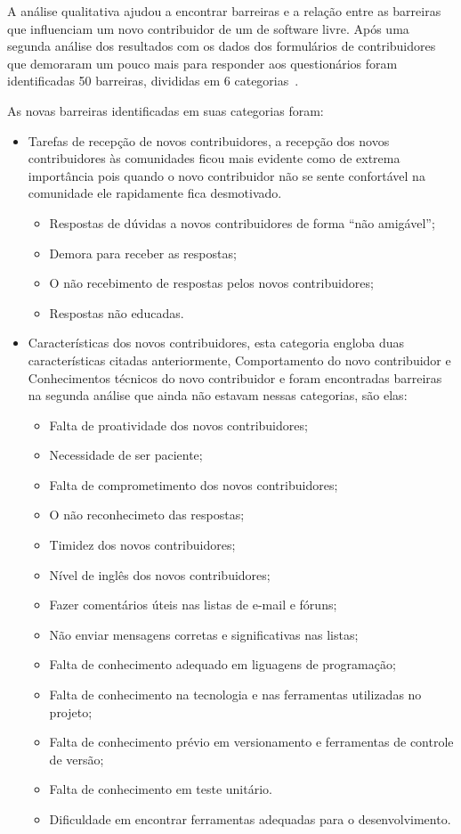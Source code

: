 A análise qualitativa ajudou a encontrar barreiras e a relação entre as barreiras
que influenciam um novo contribuidor de um de software livre.
Após uma segunda análise dos resultados com os dados dos formulários de contribuidores 
que demoraram um pouco mais para responder aos questionários foram identificadas 
50 barreiras, divididas em 6 categorias~\cite{6943482}. 

As novas barreiras identificadas em suas categorias foram:

\begin{itemize}

\item Tarefas de recepção de novos contribuidores, a recepção dos novos contribuidores às 
comunidades ficou mais evidente como de extrema importância pois quando o novo 
contribuidor não se sente confortável na comunidade ele rapidamente fica desmotivado.
	\begin{itemize}
	\item Respostas de dúvidas a novos contribuidores de forma ``não amigável'';
	\item Demora para receber as respostas;
	\item O não recebimento de respostas pelos novos contribuidores;
	\item Respostas não educadas.
	\end{itemize}

\item Características dos novos contribuidores, esta categoria engloba duas características
citadas anteriormente, Comportamento do novo contribuidor e Conhecimentos técnicos do novo
contribuidor e foram encontradas barreiras na segunda análise que ainda não estavam nessas
categorias, são elas:

	\begin{itemize}
	\item Falta de proatividade dos novos contribuidores;
	\item Necessidade de ser paciente;
	\item Falta de comprometimento dos novos contribuidores;
	\item O não reconhecimeto das respostas;
	\item Timidez dos novos contribuidores;
	\item Nível de inglês dos novos contribuidores;
	\item Fazer comentários úteis nas listas de e-mail e fóruns;
	\item Não enviar mensagens corretas e significativas nas listas;
	\item Falta de conhecimento adequado em liguagens de programação;
	\item Falta de conhecimento na tecnologia e nas ferramentas utilizadas no projeto;
	\item Falta de conhecimento prévio em versionamento e ferramentas de controle de 
versão;
	\item Falta de conhecimento em teste unitário.
	\item Dificuldade em encontrar ferramentas adequadas para o desenvolvimento.
	\end{itemize}
 

\end{itemize}
